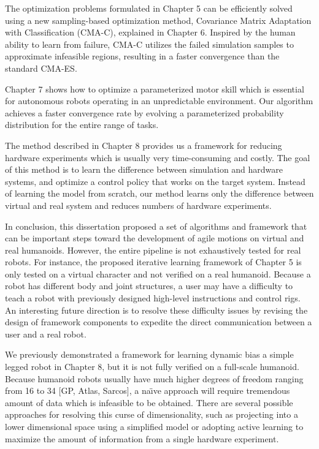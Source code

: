 The optimization problems formulated in Chapter 5 can be efficiently solved
using a new sampling-based optimization method, Covariance Matrix
Adaptation with Classification (CMA-C), explained in Chapter 6.
Inspired by the human ability to learn from failure,
CMA-C utilizes the failed simulation samples to approximate infeasible regions,
resulting in a faster convergence than the standard CMA-ES.

Chapter 7 shows how to optimize a parameterized motor skill which
is essential for autonomous robots operating in an unpredictable environment.
Our algorithm achieves a faster convergence rate by evolving a parameterized
probability distribution for the entire range of tasks.

The method described in Chapter 8 provides us a framework for reducing hardware
experiments which is usually very time-consuming and costly.
The goal of this method is to learn the difference between simulation and
hardware systems, and optimize a control policy that works on the target system.
Instead of learning the model from scratch, our method learns only the
difference between virtual and real system and reduces
numbers of hardware experiments.

In conclusion, this dissertation proposed a set of algorithms and framework
that can be important steps toward the development of agile motions on virtual
and real humanoids.
However, the entire pipeline is not exhaustively tested for real robots.
For instance, the proposed iterative learning framework of Chapter 5 is only
tested on a virtual character and not verified on a real humanoid.
Because a robot has different body and joint structures,
a user may have a difficulty to teach a robot with previously
designed high-level instructions and control rigs.
An interesting future direction is to resolve these difficulty issues by 
revising the design of framework components to expedite the direct 
communication between a user and a real robot.

We previously demonstrated a framework for learning dynamic bias
a simple legged robot in Chapter 8, but it is not fully verified on a
full-scale humanoid.
Because humanoid robots usually have much higher degrees of freedom ranging
from 16 to 34 [GP, Atlas, Sarcos], a na\"{\i}ve approach will require
tremendous amount of data which is infeasible to be obtained.
There are several possible approaches for resolving this curse of
dimensionality, such as projecting into a lower dimensional space using a
simplified model or adopting active learning to maximize the amount of
information from a single hardware experiment.












